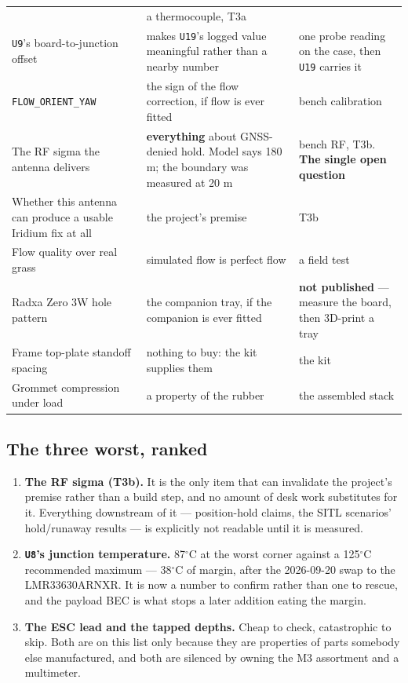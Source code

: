 \documentclass[11pt,a4paper]{article}
\newcommand{\file}[1]{\texttt{\small #1}}
\newcommand{\flag}[1]{\textcolor{warnred}{\textbf{#1}}}
\newcommand{\degC}{$^\circ$C}
\begin{document}
\begin{longtable}{@{}p{}p{}p{}@{}}
& a thermocouple, T3a \\
\file{U9}'s board-to-junction offset & makes \file{U19}'s logged value meaningful rather than
a nearby number & one probe reading on the case, then \file{U19} carries it \\
\file{FLOW\_ORIENT\_YAW} & the sign of the flow correction, if flow is ever fitted & bench
calibration \\
The RF sigma the antenna delivers & \textbf{everything} about GNSS-denied hold. Model says
180 m; the boundary was measured at 20 m & bench RF, T3b. \textbf{The single open question} \\
Whether this antenna can produce a usable Iridium fix at all & the project's premise & T3b \\
Flow quality over real grass & simulated flow is perfect flow & a field test \\
Radxa Zero 3W hole pattern & the companion tray, if the companion is ever fitted & \textbf{not
published} --- measure the board, then 3D-print a tray \\
Frame top-plate standoff spacing & nothing to buy: the kit supplies them & the kit \\
Grommet compression under load & a property of the rubber & the assembled stack \\
\bottomrule
\end{longtable}

\subsection{The three worst, ranked}

\begin{enumerate}
\item \flag{The RF sigma (T3b).} It is the only item that can invalidate the project's
premise rather than a build step, and no amount of desk work substitutes for it. Everything
downstream of it --- position-hold claims, the SITL scenarios' hold/runaway results --- is
explicitly not readable until it is measured.
\item \flag{\file{U8}'s junction temperature.} 87\degC{} at the worst corner against a
125\degC{} recommended maximum --- 38\degC{} of margin, after the 2026-09-20 swap to the
LMR33630ARNXR. It is now a number to confirm rather than one to rescue, and the payload BEC
is what stops a later addition eating the margin.
\item \flag{The ESC lead and the tapped depths.} Cheap to check, catastrophic to skip. Both
are on this list only because they are properties of parts somebody else manufactured, and
both are silenced by owning the M3 assortment and a multimeter.
\end{enumerate}
\end{document}
